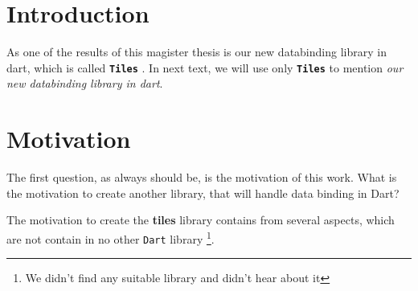 \documentclass[oneside, 12pt]{book}
\newcommand{\tiles}[0]{\textbf{\texttt{Tiles}} }
\begin{document}
\mainmatter

\pagestyle{plain}

\pagestyle{plain}
\chapter*{Introduction}\label{chap:intro}

As one of the results of this magister thesis is our new databinding library in dart, 
which is called \tiles. 
In next  text, we will use only \tiles to mention \textit{our new databinding library in dart}.


\pagestyle{headings}
\chapter{Motivation}\label{chap:motivation}

The first question, as always should be, is the motivation of this work. 
What is the motivation to create another library, that will handle data binding in Dart?

The motivation to create the \textbf{tiles} library contains from several aspects, 
which are not contain in no other \texttt{Dart} library
\footnote{We didn't find any suitable library and didn't hear about it}.
\end{document}
